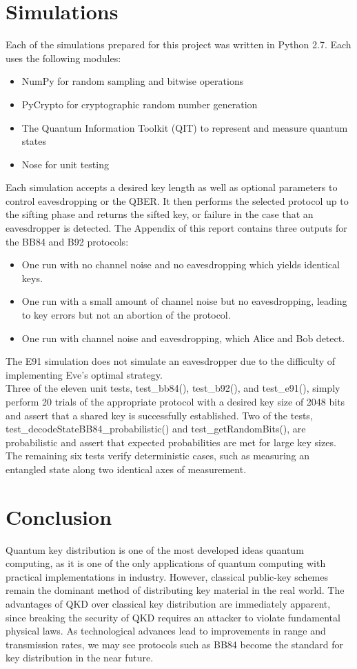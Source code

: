 \documentclass[conference]{IEEEtran}
\begin{document}
\section{Simulations}
Each of the simulations prepared for this project was written in Python 2.7. Each uses the following modules:
\begin{itemize}
\item NumPy for random sampling and bitwise operations
\item PyCrypto for cryptographic random number generation
\item The Quantum Information Toolkit (QIT) to represent and measure quantum states
  \item Nose for unit testing
\end{itemize}
Each simulation accepts a desired key length as well as optional parameters to control eavesdropping or the QBER. It then performs the selected protocol up to the sifting phase and returns the sifted key, or failure in the case that an eavesdropper is detected. The Appendix of this report contains three outputs for the BB84 and B92 protocols:
\begin{itemize}
\item One run with no channel noise and no eavesdropping which yields identical keys.
\item One run with a small amount of channel noise but no eavesdropping, leading to key errors but not an abortion of the protocol.
\item One run with channel noise and eavesdropping, which Alice and Bob detect.
\end{itemize}
The E91 simulation does not simulate an eavesdropper due to the difficulty of implementing Eve's optimal strategy.\\

Three of the eleven unit tests, test\_bb84(), test\_b92(), and test\_e91(), simply perform 20 trials of the appropriate protocol with a desired key size of 2048 bits and assert that a shared key is successfully established. Two of the tests, test\_decodeStateBB84\_probabilistic() and test\_getRandomBits(), are probabilistic and assert that expected probabilities are met for large key sizes. The remaining six tests verify deterministic cases, such as measuring an entangled state along two identical axes of measurement.\\

\section{Conclusion}
Quantum key distribution is one of the most developed ideas quantum computing, as it is one of the only applications of quantum computing with practical implementations in industry. However, classical public-key schemes remain the dominant method of distributing key material in the real world. The advantages of QKD over classical key distribution are immediately apparent, since breaking the security of QKD requires an attacker to violate fundamental physical laws. As technological advances lead to improvements in range and transmission rates, we may see protocols such as BB84 become the standard for key distribution in the near future.\\
\end{document}
